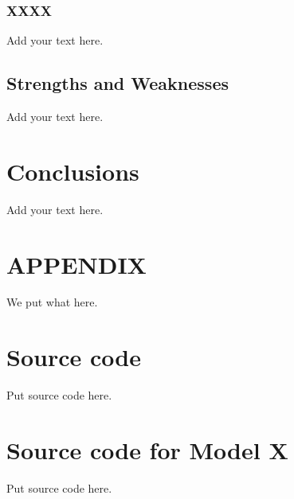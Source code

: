 \documentclass[12pt]{article}
\begin{document}
\subsubsection{XXXX}
Add your text here.

\subsection{Strengths and Weaknesses}
Add your text here.

\section{	Conclusions}
Add your text here. 





\newpage
{}
\section*{APPENDIX} 

\appendix

We put what here.

\section{Source code}

Put source code here.
\section{Source code for Model X}

Put source code here.

\end{document}
